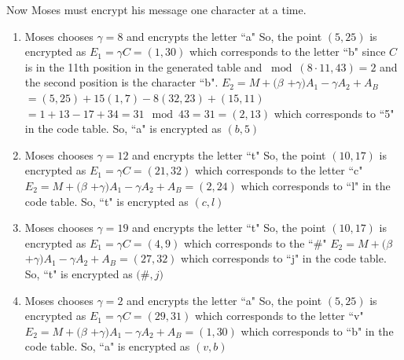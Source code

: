 \begin{eg}
\begin{flushleft}
Now Moses must encrypt his message one character at a time.
\end{flushleft}
\begin{enumerate}[(1)] 
\item Moses chooses $\gamma$$ = 8$ and encrypts the letter ``a" \newline
	So, the point $(5, 25)$ is encrypted as\newline
	$E_1 = $$\gamma$$C = (1, 30)$ which corresponds to the letter ``b" since $C$ is in the 11th position in the generated table and $\bmod(8 \cdot 11,43) = 2$ and the second position is the character ``b". \newline
	$E_2 = M +($$\beta$ $+$$\gamma$$)$$A_1 -$$\gamma$$A_2 + A_B$ \newline
	$= (5, 25) + 15(1, 7) - 8(32, 23) + (15, 11)$ \newline
	$= 1 + 13 - 17 + 34 = 31\mod 43 = 31 = (2, 13)$ which corresponds to ``5" in the code table.  So, ``a" is encrypted as $(b, 5)$
\item Moses chooses $\gamma$$ = 12$ and encrypts the letter ``t" \newline
	So, the point $(10, 17)$ is encrypted as\newline
	$E_1 = $$\gamma$$C = (21, 32)$ which corresponds to the letter ``c"\newline
	$E_2 = M +($$\beta$ $+$$\gamma$$)$$A_1 -$$\gamma$$A_2 + A_B = (2, 24)$ which corresponds to ``l" in the code table.  So, ``t" is encrypted as $(c, l)$
\item Moses chooses $\gamma$$ = 19$ and encrypts the letter ``t" \newline
	So, the point $(10, 17)$ is encrypted as\newline
	$E_1 = $$\gamma$$C = (4, 9)$ which corresponds to the ``$\#$"\newline
	$E_2 = M +($$\beta$ $+$$\gamma$$)$$A_1 -$$\gamma$$A_2 + A_B = (27, 32)$ which corresponds to ``j" in the code table.  So, ``t" is encrypted as $($$\#$$, j)$
\item Moses chooses $\gamma$$ = 2$ and encrypts the letter ``a" \newline
	So, the point $(5, 25)$ is encrypted as\newline
	$E_1 = $$\gamma$$C = (29, 31)$ which corresponds to the letter ``v"\newline
	$E_2 = M +($$\beta$ $+$$\gamma$$)$$A_1 -$$\gamma$$A_2 + A_B = (1, 30)$ which corresponds to ``b" in the code table.  So, ``a" is encrypted as $(v, b)$

\end{enumerate}
\end{eg}
